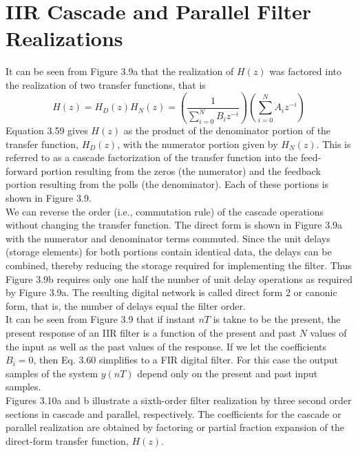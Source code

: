 \documentclass[11pt]{report}
\theoremstyle{example}
\begin{document}
\section{IIR Cascade and Parallel Filter Realizations}
It can be seen from Figure 3.9a that the realization of $H(z)$ was factored into the realization of two transfer functions, that is
\begin{equation}
	H(z)=H_D(z)H_N(z)=\left(\frac{1}{\sum_{i=0}^N{B_iz^{-i}}}\right)\left(\sum_{i=0}^N{A_iz^{-i}}\right)
\end{equation}
Equation 3.59 gives $H(z)$ as the product of the denominator portion of the transfer function, $H_D(z)$, with the numerator portion given by $H_N(z)$. This is referred to as a cascade factorization of the transfer function into the feed-forward portion resulting from the zeros (the numerator) and the feedback portion resulting from the polls (the denominator). Each of these portions is shown in Figure 3.9.\\
We can reverse the order (i.e., commutation rule) of the cascade operations without changing the transfer function. The direct form is shown in Figure 3.9a with the numerator and denominator terms commuted. Since the unit delays (storage elements) for both portions contain identical data, the delays can be combined, thereby reducing the storage required for implementing the filter. Thus Figure 3.9b requires only one half the number of unit delay operations as required by Figure 3.9a. The resulting digital network is called direct form 2 or canonic form, that is, the number of delays equal the filter order.\\
It can be seen from Figure 3.9 that if instant $nT$ is takne to be the present, the present response of an IIR filter is a function of the present and past $N$ values of the input as well as the past values of the response. If we let the coefficients $B_i=0$, then Eq. 3.60 simplifies to a FIR digital filter. For this case the output samples of the system $y(nT)$ depend only on the present and past input samples.\\
Figures 3.10a and b illustrate a sixth-order filter realization by three second order sections in cascade and parallel, respectively. The coefficients for the cascade or parallel realization are obtained by factoring or partial fraction expansion of the direct-form transfer function, $H(z)$.
\end{document}
